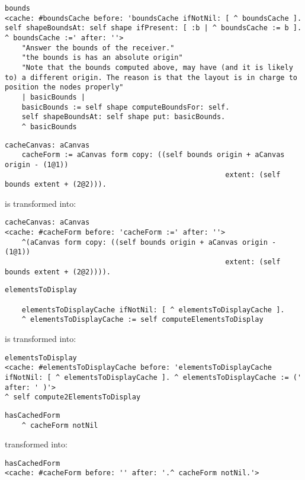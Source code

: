 \documentclass[runningheads]{llncs}
\begin{document}
\begin{lstlisting}
bounds
<cache: #boundsCache before: 'boundsCache ifNotNil: [ ^ boundsCache ]. self shapeBoundsAt: self shape ifPresent: [ :b | ^ boundsCache := b ]. ^ boundsCache :=' after: ''>
	"Answer the bounds of the receiver."
	"the bounds is has an absolute origin"
	"Note that the bounds computed above, may have (and it is likely to) a different origin. The reason is that the layout is in charge to position the nodes properly"
	| basicBounds |
	basicBounds := self shape computeBoundsFor: self.
	self shapeBoundsAt: self shape put: basicBounds.
	^ basicBounds
\end{lstlisting}

\begin{lstlisting}
cacheCanvas: aCanvas
	cacheForm := aCanvas form copy: ((self bounds origin + aCanvas origin - (1@1)) 
													extent: (self bounds extent + (2@2))).
\end{lstlisting}

is transformed into:

\begin{lstlisting}
cacheCanvas: aCanvas
<cache: #cacheForm before: 'cacheForm :=' after: ''>
	^(aCanvas form copy: ((self bounds origin + aCanvas origin - (1@1)) 
													extent: (self bounds extent + (2@2)))).
\end{lstlisting}


\begin{lstlisting}
elementsToDisplay

	elementsToDisplayCache ifNotNil: [ ^ elementsToDisplayCache ].
	^ elementsToDisplayCache := self computeElementsToDisplay
\end{lstlisting}

is transformed into:

\begin{lstlisting}
elementsToDisplay
<cache: #elementsToDisplayCache before: 'elementsToDisplayCache ifNotNil: [ ^ elementsToDisplayCache ]. ^ elementsToDisplayCache := (' after: ' )'>
^ self compute2ElementsToDisplay
\end{lstlisting}	

\begin{lstlisting}
hasCachedForm
	^ cacheForm notNil
\end{lstlisting}	

transformed into:

\begin{lstlisting}
hasCachedForm
<cache: #cacheForm before: '' after: '.^ cacheForm notNil.'>
\end{lstlisting}	
\end{document}
